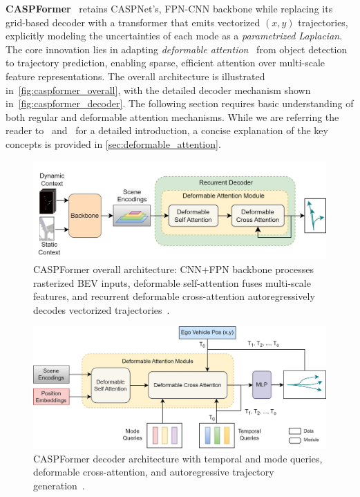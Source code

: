 \begin{description}[leftmargin=1em,itemsep=2pt]
\textbf{CASPFormer}~\cite{caspformerYadav2024} retains CASPNet's, FPN-CNN backbone while replacing its grid-based decoder with a transformer that emits vectorized \((x,y)\) trajectories, explicitly modeling the uncertainties of each mode as a \emph{parametrized Laplacian}. The core innovation lies in adapting \emph{deformable attention}~\cite{zhu2021deformabledetr} from object detection to trajectory prediction, enabling sparse, efficient attention over multi-scale feature representations. The overall architecture is illustrated in~\autoref{fig:caspformer_overall}, with the detailed decoder mechanism shown in~\autoref{fig:caspformer_decoder}. The following section requires basic understanding of both regular and deformable attention mechanisms. While we are referring the reader to~\cite{vaswani2023attention} and~\cite{zhu2021deformabledetr} for a detailed introduction, a concise explanation of the key concepts is provided in \autoref{sec:deformable_attention}.

\begin{figure}[ht]
  \centering
  \includegraphics[width=\linewidth]{figures/caspformer-overall-arch.jpg}
  \caption{CASPFormer overall architecture: CNN+FPN backbone processes rasterized BEV inputs, deformable self-attention fuses multi-scale features, and recurrent deformable cross-attention autoregressively decodes vectorized trajectories~\cite{caspformerYadav2024}.}
  \label{fig:caspformer_overall}
\end{figure}

\begin{figure}[ht]
  \centering
  \includegraphics[width=0.85\linewidth]{figures/caspformer_decoder.jpg}
  \caption{CASPFormer decoder architecture with temporal and mode queries, deformable cross-attention, and autoregressive trajectory generation~\cite{caspformerYadav2024}.}
  \label{fig:caspformer_decoder}
\end{figure}


\end{description}
